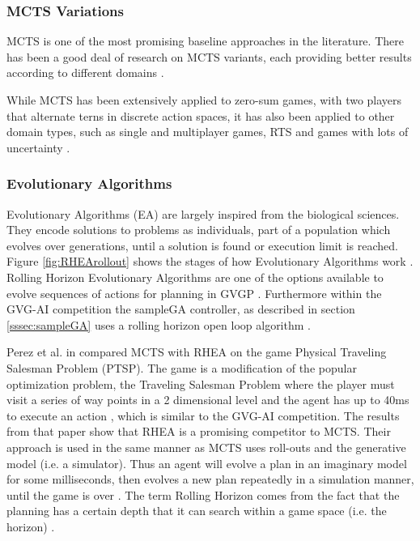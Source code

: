 \documentclass[journal]{IEEEtran}
\begin{document}
		\subsubsection{MCTS Variations} \label{sssec:MCTSvariations}
			MCTS is one of the most promising baseline approaches in the  literature.
			There has been a good deal of research on MCTS variants, each providing better results according to different domains \cite{browne2012survey, park2015mcts, perez2014knowledge, ilhan2017monte, de2016monte, frydenberg2015investigating, subramanianefficient}.

			While MCTS has been extensively applied to zero-sum games, with two players that alternate terns in discrete action spaces, it has also been applied to other domain types, such as single and multiplayer games, RTS and games with lots of uncertainty \cite{browne2012survey, de2016monte, frydenberg2015investigating}.

		


		\subsubsection{Evolutionary Algorithms} \label{sssec:EA}
			Evolutionary Algorithms (EA) are largely inspired from the biological sciences. They encode solutions to problems as individuals, part of a population which evolves over generations, until a solution is found or execution limit is reached. Figure \ref{fig:RHEArollout} shows the stages of how Evolutionary Algorithms work \cite{gaina2017rolling}.
			Rolling Horizon Evolutionary Algorithms are one of the options available to evolve sequences of actions for planning in GVGP \cite{perez2013rolling}. Furthermore within the GVG-AI competition the sampleGA controller, as described in section \ref{sssec:sampleGA} uses a rolling horizon open loop algorithm \cite{perez20162014}.

			Perez et al. in \cite{perez2013rolling} compared MCTS with RHEA on the game Physical Traveling Salesman Problem (PTSP). 
			The game is a modification of the popular optimization problem, the Traveling Salesman Problem \cite{perez2014solving, flood1956traveling} where the player must visit a series of way points in a 2 dimensional level and the agent has up to 40ms to execute an action \cite{perez2013rolling}, which is similar to the GVG-AI competition.  The results from that paper show that RHEA is a promising competitor to MCTS.
			Their approach is used in the same manner as MCTS uses roll-outs and the generative model (i.e. a simulator). Thus an agent will evolve a plan in an imaginary model for some milliseconds, then evolves a new plan repeatedly in a simulation manner, until the game is over \cite{perez2013rolling}.
			The term Rolling Horizon comes from the fact  that the planning has a certain depth that it can search within a game space  (i.e. the horizon) \cite{gaina2017analysis, gaina2017rolling}.
			
\end{document}
